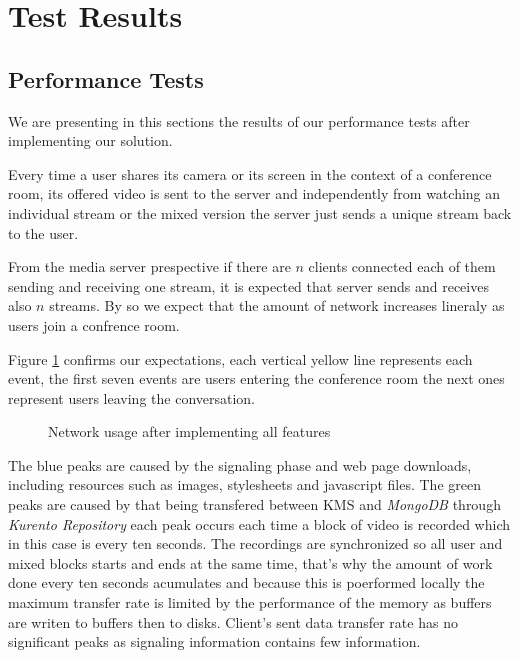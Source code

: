 \section{Test Results}
  \subsection {Performance Tests}
  
      We are presenting in this sections the results of our performance tests after implementing our solution.

      Every time a user shares its camera or its screen in the context of a conference room, its offered video is sent to the server and independently from watching an individual stream or the mixed version the server just sends a unique stream back to the user.

      From the media server prespective if there are $n$ clients connected each of them sending and receiving one stream, it is expected that server sends and receives also $n$ streams. By so we expect that the amount of network increases lineraly as users join a confrence room.

      Figure \ref{fig:test_full_features_net} confirms our expectations, each vertical yellow line represents each event, the first seven events are users entering the conference room the next ones represent users leaving the conversation. 
      


\begin{figure}[!htb]
  \begin{center}
    
  \end{center}
  \caption{Network usage after implementing all features}
  \label{fig:test_full_features_net}
\end{figure}

      The blue peaks are caused by the signaling phase and web page downloads, including resources such as images, stylesheets and javascript files. 
      The green peaks are caused by that being transfered between \ac{KMS} and \emph{MongoDB} through \emph{Kurento Repository} each peak occurs each time a block of video is recorded which in this case is every ten seconds. 
      The recordings are synchronized so all user and mixed blocks starts and ends at the same time, that's why the amount of work done every ten seconds acumulates and because this is poerformed locally the maximum transfer rate is limited by the performance of the memory as buffers are writen to buffers then to disks. 
      Client's sent data transfer rate has no significant peaks as signaling information contains few information.

